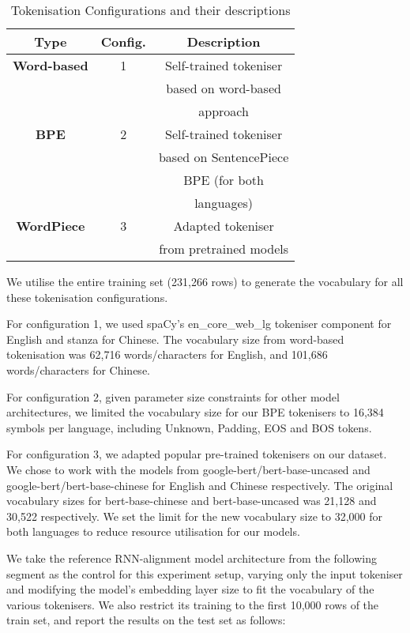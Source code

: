 \documentclass[11pt]{article}
\begin{document}
\begin{table}[h]
\begin{center}
\begin{tabular}{*3c}
\toprule
\bf Type & \bf Config. & \bf Description \\
\midrule
\bf Word-based & 1 & Self-trained tokeniser \\ 
& & based on word-based \\ 
& & approach \\
\midrule
\bf BPE & 2 & Self-trained tokeniser \\
& & based on SentencePiece \\
& & BPE (for both \\
& & languages)\\
\midrule
\bf WordPiece & 3 & Adapted tokeniser \\
& & from pretrained models\\
\bottomrule
\end{tabular}
\end{center}
\caption{
\label{tokenisation-configs} Tokenisation Configurations and their descriptions
}
\end{table}

We utilise the entire training set (231,266 rows) to generate the vocabulary
for all these tokenisation configurations.

For configuration 1, we used spaCy's en\_core\_web\_lg tokeniser component for
English and stanza for Chinese. The vocabulary size from word-based
tokenisation was 62,716 words/characters for English, and 101,686
words/characters for Chinese.

For configuration 2, given parameter size constraints for other model
architectures, we limited the vocabulary size for our BPE tokenisers to 16,384
symbols per language, including Unknown, Padding, EOS and BOS tokens.

For configuration 3, we adapted popular pre-trained
tokenisers on our dataset. We chose to work with the models from
google-bert/bert-base-uncased and google-bert/bert-base-chinese for English and
Chinese respectively. The original vocabulary sizes for bert-base-chinese and
bert-base-uncased was 21,128 and 30,522 respectively.
We set the limit for the new vocabulary size to
32,000 for both languages to reduce resource utilisation for our models.

We take the reference RNN-alignment model architecture from the following
segment as the control for this experiment setup, varying only the input
tokeniser and modifying the model’s embedding layer size to fit the vocabulary
of the various tokenisers. We also restrict its training to the first 10,000
rows of the train set, and report the results on the test set as follows:
\end{document}

